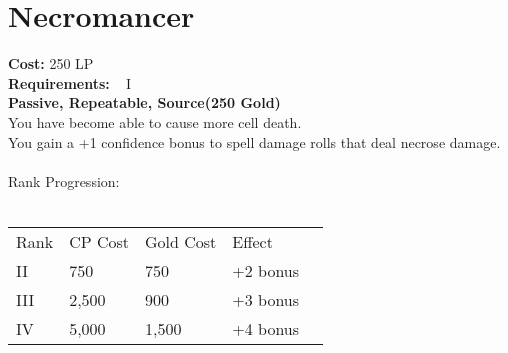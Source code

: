 \section{Necromancer}\label{perk:necromancer}
\textbf{Cost:} 250 LP\\
\textbf{Requirements:} ~ I\\
\textbf{Passive, Repeatable, Source(250 Gold)}\\
You have become able to cause more cell death.\\
You gain a +1 confidence bonus to spell damage rolls that deal necrose damage.\\
\\
Rank Progression:\\
\\
\begin{tabular}{l | l | l | l | l}
    Rank & CP Cost & Gold Cost &  Effect\\
    II & 750 & 750 & +2 bonus\\
    III & 2,500 & 900 & +3 bonus\\
    IV & 5,000 & 1,500 & +4 bonus\\
\end{tabular}